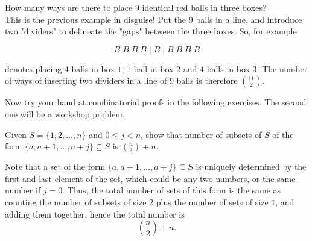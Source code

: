\documentclass[11pt,dvipsnames]{book}
\numberwithin{figure}{section} %
\numberwithin{table}{section} %
\begin{document}
\begin{example}\label{identicalballsinboxes}
How many ways are there to place $9$ identical red balls in three boxes? \\

This is the previous example in disguise! Put the
$9$ balls in a line, and introduce two "dividers"
to delineate the "gaps" between the three boxes.
So, for example

$$ B\;B\;B\;B\; |\; B\; |\; B\; B\;B\;B$$

\noindent
denotes placing $4$ balls in box $1$, $1$ ball in box $2$ and $4$ balls in box 3. The number of ways of inserting two dividers in a line of $9$ balls is therefore ${11\choose 2}$.

\end{example}
%
%
%
%
%

Now try your hand at combinatorial proofs in the following exercises. The second one will be a workshop problem.

\begin{exercise}
Given $S=\{1,2, \dots ,n\}$ and $0\leq j<n$, show that number of subsets of $S$ of the form $\{a,a+1, \dots ,a+j\}\subseteq S$ is ${n\choose 2} + n$.
\begin{solution}
Note that a set of the form $\{a,a+1, \dots ,a+j\}\subseteq S$ is uniquely determined by the first and last element of the set, which could be any two numbers, or the same number if $j=0$. Thus, the total number of sets of this form is the same as counting the number of subsets of size $2$ plus the number of sets of size $1$, and adding them together, hence the total number is
\[
{n\choose 2} + n.
\]
\end{solution}
\end{exercise}
\end{document}
